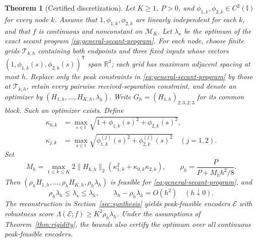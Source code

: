 \documentclass[journal,12pt,onecolumn,draftclsnofoot]{IEEEtran}
\newtheorem{theorem}{Theorem}
\newcommand{\enc}{\mathscr{E}}\newcommand{\dec}{\mathscr{D}}\newcommand{\R}{\mathbb R}\newcommand{\C}{\mathbb C}
\newcommand{\T}{\mathsf T}\newcommand{\suc}{\succeq}
\begin{document}
\begin{theorem}[Certified discretization]
\label{thm:certifiedgrid}
Let $K\ge1$, $P>0$, and $\phi_{1,k},\phi_{2,k}\in C^2(\mathbb I)$
for every node $k$.
Assume that $1,\phi_{1,k},\phi_{2,k}$ are linearly independent for each $k$,
and that $f$ is continuous and nonconstant on $\mathcal M_K$.
Let $\lambda_\star$ be the optimum of the exact secant program \eqref{eq:general-secant-program}.
For each node, choose finite grids $\mathcal T_{k,h}$ containing both endpoints and three
fixed inputs whose vectors $(1,\phi_{1,k}(s),\phi_{2,k}(s))^\T$ span $\mathbb R^3$;
each grid has maximum adjacent spacing at most $h$.
Replace only the peak constraints in
\eqref{eq:general-secant-program} by those at $\mathcal T_{k,h}$, retain
every pairwise received-separation constraint, and denote an optimizer by
$(H_{1,h},\ldots,H_{K,h},{ \lambda_h})$.
Write $G_h=(H_{1,h})_{2:3,2:3}$ for its common block.
Such an optimizer exists. Define
$$
\begin{aligned}
\kappa_{0,k}&=\max_{s\in\mathbb I}
\sqrt{1+\phi_{1,k}(s)^2+\phi_{2,k}(s)^2},\\
\kappa_{j,k}&=\max_{s\in\mathbb I}
\sqrt{\phi_{1,k}^{(j)}(s)^2+\phi_{2,k}^{(j)}(s)^2}
\quad(j=1,2).
\end{aligned}
$$
Set
$$
M_h=\max_{1\le k\le K}2\|H_{k,h}\|_2
(\kappa_{1,k}^2+\kappa_{0,k}\kappa_{2,k}),\qquad
\rho_h=\frac{P}{P+M_hh^2/8}.
$$
Then $(\rho_hH_{1,h},\ldots,\rho_hH_{K,h},\rho_h{ \lambda_h})$ is feasible for
\eqref{eq:general-secant-program}, and
\begin{equation}
\rho_h{ \lambda_h}\le\lambda_\star\le { \lambda_h},
\qquad { \lambda_h}-\rho_h{ \lambda_h}=O(h^2)\quad(h\downarrow0).
\label{eq:certifiedgrid}
\end{equation}
The reconstruction in Section~\ref{sec:synthesis} yields peak-feasible
encoders $\enc$ with robustness score $\Lambda(\enc;f)\ge K^2\rho_h\lambda_h$.
Under the assumptions of Theorem~\ref{thm:rigidity}, the bounds
also certify the optimum over all continuous peak-feasible encoders.


\end{theorem}
\end{document}
